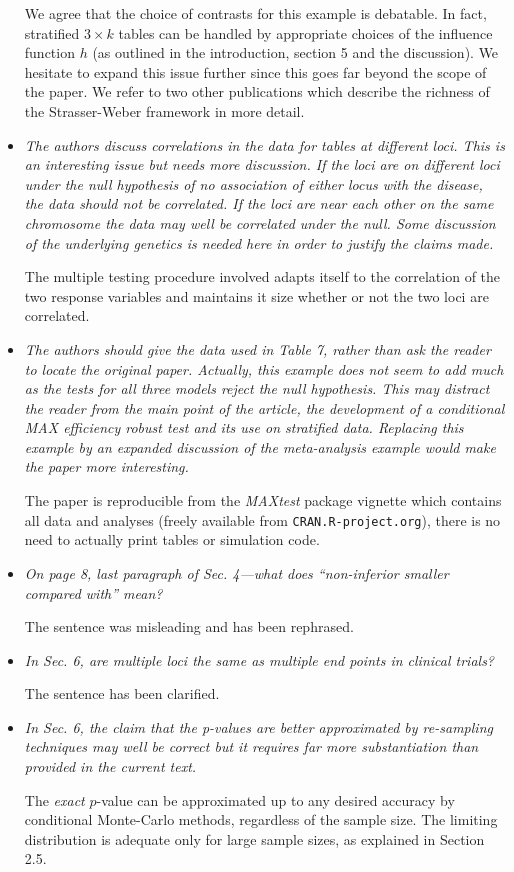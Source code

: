 \documentclass{article}
\begin{document}
\begin{itemize}
We agree that the choice of contrasts for this example is debatable.
In fact, stratified $3 \times k$ tables can be handled by appropriate
choices of the influence function $h$ (as outlined in the introduction,
section 5 and the discussion). We hesitate to expand this issue further
since this goes far beyond the scope of the paper. We refer to two
other publications which describe the richness of the Strasser-Weber
framework in more detail.

\item
\textit{
The authors discuss correlations in the data for tables at different loci. This is an
interesting issue but needs more discussion. If the loci are on different loci under the null
hypothesis of no association of either locus with the disease, the data should not be
correlated. If the loci are near each other on the same chromosome the data may well be
correlated under the null. Some discussion of the underlying genetics is needed here in
order to justify the claims made.}

The multiple testing procedure involved adapts itself to the correlation
of the two response variables and maintains it size whether or not the
two loci are correlated.

\item
\textit{
The authors should give the data used in Table 7, rather than ask the reader to locate
the original paper. Actually, this example does not seem to add much as the tests for all
three models reject the null hypothesis. This may distract the reader from the main point
of the article, the development of a conditional MAX efficiency robust test and its use on
stratified data. Replacing this example by an expanded discussion of the meta-analysis
example would make the paper more interesting.}

The paper is reproducible from the \textit{MAXtest} package vignette which
contains all data and analyses (freely available from
\texttt{CRAN.R-project.org}), there is no need to actually print
tables or simulation code.

\item
\textit{
On page 8, last paragraph of Sec. 4—what does “non-inferior smaller compared with”
mean?}

The sentence was misleading and has been rephrased.

\item
\textit{
In Sec. 6, are multiple loci the same as multiple end points in clinical trials?}

The sentence has been clarified.

\item
\textit{
In Sec. 6, the claim that the p-values are better approximated by re-sampling techniques
may well be correct but it requires far more substantiation than provided in the current
text.
}

The \emph{exact} $p$-value can be approximated up to any desired accuracy
by conditional Monte-Carlo methods, regardless of the sample size. 
The limiting distribution is adequate only for large sample sizes, as
explained in Section 2.5.

\end{itemize}



\end{document}
